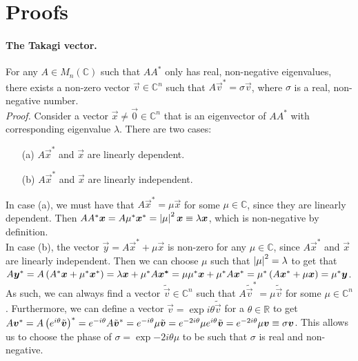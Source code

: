 \documentclass[../main.tex]{subfiles}
\begin{document}
\section{Proofs}
\paragraph{The Takagi vector.}
For any \(A \in M_{n}(\mathbb{C})\) such that \(AA^\ast\) only has real, non-negative eigenvalues, there exists a non-zero vector \(\vec{v} \in \mathbb{C}^n\) such that \(A \vec{v}^* = \sigma \vec{v}\), where \(\sigma\) is a real, non-negative number.\\
\emph{Proof.} Consider a vector \(\vec{x} \neq \vec{0} \in \mathbb{C}^n\) that is an eigenvector of \(AA^\ast\) with corresponding eigenvalue \(\lambda\).
There are two cases:
\begin{itemize}
  \item[(a)] \(A\vec{x}^*\) and \(\vec{x}\) are linearly dependent.
  \item[(b)] \(A\vec{x}^*\) and \(\vec{x}\) are linearly independent.
\end{itemize}
In case (a), we must have that \(A\vec{x}^* = \mu \vec{x}\) for some \(\mu \in \mathbb{C}\), since they are linearly dependent.
Then \(AA^\ast \boldsymbol{x} = A \mu^\ast \boldsymbol{x}^* = \left|\mu\right|^2 \boldsymbol{x} \equiv \lambda \boldsymbol{x}\), which is non-negative by definition.\\
In case (b), the vector \(\vec{y} = A\vec{x}^* + \mu \vec{x}\) is non-zero for any \(\mu \in \mathbb{C}\), since \(A\vec{x}^*\) and \(\vec{x}\) are linearly independent.
Then we can choose \(\mu\) such that \(\left|\mu\right|^2 = \lambda\) to get that \(A \boldsymbol{y}^* = A\left(A^\ast \boldsymbol{x} + \mu^\ast \boldsymbol{x}^*\right) = \lambda\boldsymbol{x} + \mu^\ast A\boldsymbol{x^*} = \mu\mu^\ast \boldsymbol{x} + \mu^\ast A\boldsymbol{x}^* = \mu^\ast \left(A \boldsymbol{x}^* + \mu \boldsymbol{x}\right) = \mu^\ast \boldsymbol{y}\).\\
As such, we can always find a vector \(\tilde{\vec{v}} \in \mathbb{C}^n\) such that \(A \tilde{\vec{v}}^* = \mu \tilde{\vec{v}}\) for some \(\mu \in \mathbb{C}^n\).
Furthermore, we can define a vector \(\vec{v} = \exp{i\theta} \tilde{\vec{v}}\) for a \(\theta \in \mathbb{R}\) to get \(A\boldsymbol{v}^* = A \left(e^{i\theta} \tilde{\boldsymbol{v}}\right)^\ast = e^{-i\theta} A\tilde{\boldsymbol{v}}^* = e^{-i\theta} \mu \tilde{\boldsymbol{v}} = e^{-2i\theta} \mu e^{i\theta} \tilde{\boldsymbol{v}} = e^{-2i\theta} \mu \boldsymbol{v} \equiv \sigma \boldsymbol{v}\).
This allows us to choose the phase of \(\sigma = \exp{-2i\theta} \mu\) to be such that \(\sigma\) is real and non-negative.
\medskip
\end{document}
